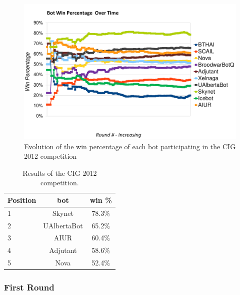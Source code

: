 \documentclass[journal]{IEEEtran}
\begin{document}
\begin{figure}[t]
    \centering
    \includegraphics[width=0.95\columnwidth]{figures/cig2012-ResultsRound90.pdf}
    \caption{Evolution of the win percentage of each bot participating in the
CIG 2012 competition}
    \label{fig:cig2012-results}
\end{figure}

\begin{table}[b]
\caption{Results of the CIG 2012 competition.}
\label{tab:cig2012}
\begin{small}
\begin{center}
\begin{tabular}{|l|c|c|}
\hline
Position & bot & win \% \\ \hline
1 & Skynet & 78.3\% \\
2 & UAlbertaBot & 65.2\% \\
3 & AIUR & 60.4\% \\
4 & Adjutant & 58.6\% \\
5 & Nova & 52.4\% \\ \hline
\end{tabular}
\end{center}
\end{small}
\end{table}


\subsubsection{First Round}
\label{sec:cig-first-round}
\end{document}
